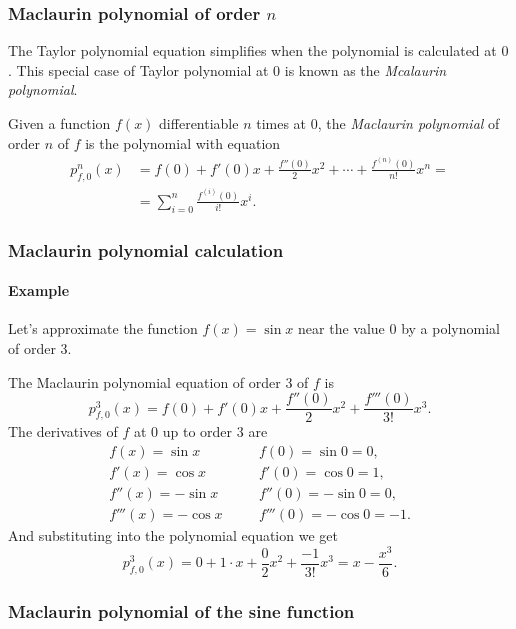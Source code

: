 \begin{frame}
\frametitle{Maclaurin polynomial of order $n$}
The Taylor polynomial equation simplifies when the polynomial is calculated at $0$.
This special case of Taylor polynomial at $0$ is known as the \emph{Mcalaurin polynomial}.
\begin{definition}
Given a function $f(x)$ differentiable $n$ times at $0$, the \emph{Maclaurin polynomial} of order $n$ of $f$ is the polynomial with equation
\begin{align*}
p_{f,0}^n(x)&=f(0)+f'(0)x+\frac{f''(0)}{2}x^2+\cdots +\frac{f^{(n)}(0)}{n!}x^n = \\ &=\sum_{i=0}^{n}\frac{f^{(i)}(0)}{i!}x^i.
\end{align*}
\end{definition}
\end{frame}


\begin{frame}
\frametitle{Maclaurin polynomial calculation}
\framesubtitle{Example}
Let's approximate the function $f(x)=\sin x$ near the value $0$ by a polynomial of order $3$.

The Maclaurin polynomial equation of order $3$ of $f$ is
\[
p_{f,0}^3(x)=f(0)+f'(0)x+\frac{f''(0)}{2}x^2+\frac{f'''(0)}{3!}x^3.
\]
The derivatives of $f$ at $0$ up to order $3$ are
\[
\begin{array}{lll}
f(x)=\sin x & \quad & f(0)=\sin 0 =0,\\
f'(x)=\cos x & & f'(0)=\cos 0=1,\\
f''(x)=-\sin x & & f''(0)=-\sin 0=0,\\
f'''(x)=-\cos x & & f'''(0)=-\cos 0=-1.
\end{array}
\]
And substituting into the polynomial equation we get
\[
p_{f,0}^3(x)=0+1\cdot x+\frac{0}{2}x^2+\frac{-1}{3!}x^3= x-\frac{x^3}{6}.
\]
\end{frame}


\begin{frame}
\frametitle{Maclaurin polynomial of the sine function}
\begin{center}

\end{center}
\end{frame}


